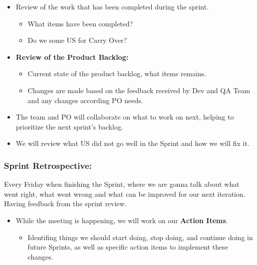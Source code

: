 \begin{itemize}
\tightlist
\item
  Review of the work that has been completed during the sprint.

  \begin{itemize}
  \tightlist
  \item
    What items have been completed?
  \item
    Do we some US for Carry Over?
  \end{itemize}
\item
  \textbf{Review of the Product Backlog:}

  \begin{itemize}
  \tightlist
  \item
    Current state of the product backlog, what items remains.
  \item
    Changes are made based on the feedback received by Dev and QA Team
    and any changes according PO needs.
  \end{itemize}
\item
  The team and PO will collaborate on what to work on next, helping to
  prioritize the next sprint's backlog.
\item
  We will review what US did not go well in the Sprint and how we will
  fix it.
\end{itemize}

\hypertarget{sprintretrospective}{
\subsubsection{Sprint Retrospective:}\label{sprintretrospective}}

Every Friday when finishing the Sprint, where we are gonna talk about
what went right, what went wrong and what can be improved for our next
iteration. Having feedback from the sprint review.

\begin{itemize}
\tightlist
\item
  While the meeting is happening, we will work on our \textbf{Action
  Items}.

  \begin{itemize}
  \tightlist
  \item
    Identifing things we should start doing, stop doing, and continue
    doing in future Sprints, as well as specific action items to
    implement these changes.
  \end{itemize}
\end{itemize}

